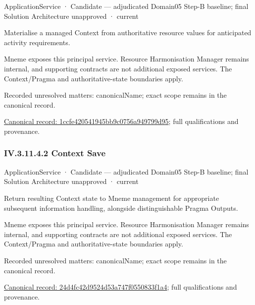\label{element:1ccfe420541945bb9c0756a949799d95}
{\small ApplicationService · Candidate — adjudicated Domain05 Step-B baseline; final Solution Architecture unapproved · current}\par

Materialise a managed Context from authoritative resource values for anticipated activity requirements.



Mneme exposes this principal service. Resource Harmonisation Manager remains internal, and supporting contracts are not additional exposed services. The Context/Pragma and authoritative-state boundaries apply.


{\small Recorded unresolved matters: canonicalName; exact scope remains in the canonical record.}\par
{\footnotesize \href{../../../../continuum/application/application-service/1ccfe420541945bb9c0756a949799d95.md}{Canonical record: 1ccfe420541945bb9c0756a949799d95}; full qualifications and provenance.}\par
\subsubsection*{IV.3.11.4.2 Context Save}
\label{navigation:IV.3.11.4.2}

\label{element:24d4fc42d9524d53a747f0550833f1a4}
{\small ApplicationService · Candidate — adjudicated Domain05 Step-B baseline; final Solution Architecture unapproved · current}\par

Return resulting Context state to Mneme management for appropriate subsequent information handling, alongside distinguishable Pragma Outputs.



Mneme exposes this principal service. Resource Harmonisation Manager remains internal, and supporting contracts are not additional exposed services. The Context/Pragma and authoritative-state boundaries apply.


{\small Recorded unresolved matters: canonicalName; exact scope remains in the canonical record.}\par
{\footnotesize \href{../../../../continuum/application/application-service/24d4fc42d9524d53a747f0550833f1a4.md}{Canonical record: 24d4fc42d9524d53a747f0550833f1a4}; full qualifications and provenance.}\par
